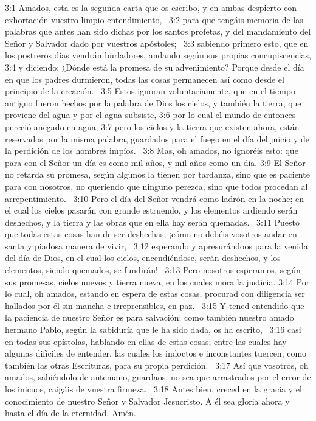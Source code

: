 3:1 Amados, esta es la segunda carta que os escribo, y en ambas despierto con exhortación vuestro limpio entendimiento,  
3:2 para que tengáis memoria de las palabras que antes han sido dichas por los santos profetas, y del mandamiento del Señor y Salvador dado por vuestros apóstoles;  
3:3 sabiendo primero esto, que en los postreros días vendrán burladores, andando según sus propias concupiscencias, 
3:4 y diciendo: ¿Dónde está la promesa de su advenimiento? Porque desde el día en que los padres durmieron, todas las cosas permanecen así como desde el principio de la creación.  
3:5 Estos ignoran voluntariamente, que en el tiempo antiguo fueron hechos por la palabra de Dios los cielos, y también la tierra, que proviene del agua y por el agua subsiste, 
3:6 por lo cual el mundo de entonces pereció anegado en agua; 
3:7 pero los cielos y la tierra que existen ahora, están reservados por la misma palabra, guardados para el fuego en el día del juicio y de la perdición de los hombres impíos.  
3:8 Mas, oh amados, no ignoréis esto: que para con el Señor un día es como mil años, y mil años como un día. 
3:9 El Señor no retarda su promesa, según algunos la tienen por tardanza, sino que es paciente para con nosotros, no queriendo que ninguno perezca, sino que todos procedan al arrepentimiento.  
3:10 Pero el día del Señor vendrá como ladrón en la noche; en el cual los cielos pasarán con grande estruendo, y los elementos ardiendo serán deshechos, y la tierra y las obras que en ella hay serán quemadas.  
3:11 Puesto que todas estas cosas han de ser deshechas, ¡cómo no debéis vosotros andar en santa y piadosa manera de vivir,  
3:12 esperando y apresurándoos para la venida del día de Dios, en el cual los cielos, encendiéndose, serán deshechos, y los elementos, siendo quemados, se fundirán!  
3:13 Pero nosotros esperamos, según sus promesas, cielos nuevos y tierra nueva, en los cuales mora la justicia. 
3:14 Por lo cual, oh amados, estando en espera de estas cosas, procurad con diligencia ser hallados por él sin mancha e irreprensibles, en paz.  
3:15 Y tened entendido que la paciencia de nuestro Señor es para salvación; como también nuestro amado hermano Pablo, según la sabiduría que le ha sido dada, os ha escrito,  
3:16 casi en todas sus epístolas, hablando en ellas de estas cosas; entre las cuales hay algunas difíciles de entender, las cuales los indoctos e inconstantes tuercen, como también las otras Escrituras, para su propia perdición.  
3:17 Así que vosotros, oh amados, sabiéndolo de antemano, guardaos, no sea que arrastrados por el error de los inicuos, caigáis de vuestra firmeza.  
3:18 Antes bien, creced en la gracia y el conocimiento de nuestro Señor y Salvador Jesucristo. A él sea gloria ahora y hasta el día de la eternidad. Amén.
